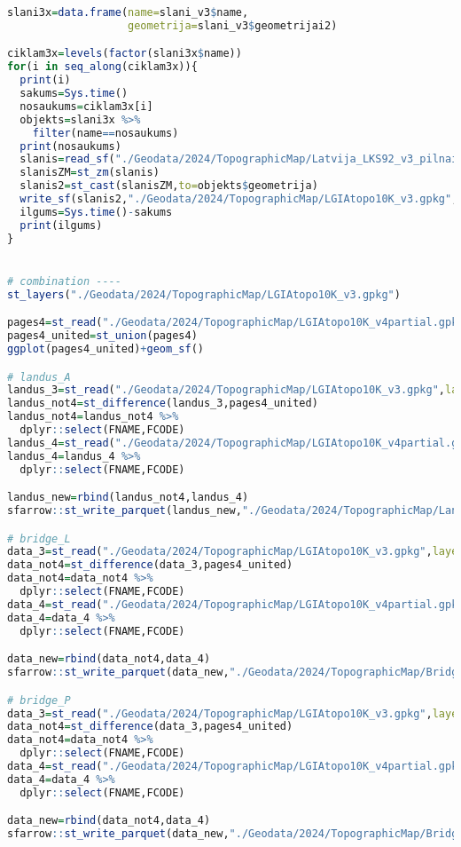 \documentclass[
]{book}
\begin{document}
\begin{lstlisting}[language=R]
slani3x=data.frame(name=slani_v3$name,
                   geometrija=slani_v3$geometrijai2)

ciklam3x=levels(factor(slani3x$name))
for(i in seq_along(ciklam3x)){
  print(i)
  sakums=Sys.time()
  nosaukums=ciklam3x[i]
  objekts=slani3x %>% 
    filter(name==nosaukums)
  print(nosaukums)
  slanis=read_sf("./Geodata/2024/TopographicMap/Latvija_LKS92_v3_pilnais.gdb/",layer=nosaukums)
  slanisZM=st_zm(slanis)
  slanis2=st_cast(slanisZM,to=objekts$geometrija)
  write_sf(slanis2,"./Geodata/2024/TopographicMap/LGIAtopo10K_v3.gpkg",layer=nosaukums,append=FALSE)
  ilgums=Sys.time()-sakums
  print(ilgums)
}


# combination ----
st_layers("./Geodata/2024/TopographicMap/LGIAtopo10K_v3.gpkg")

pages4=st_read("./Geodata/2024/TopographicMap/LGIAtopo10K_v4partial.gpkg",layer="Topo10_lapas")
pages4_united=st_union(pages4)
ggplot(pages4_united)+geom_sf()

# landus_A
landus_3=st_read("./Geodata/2024/TopographicMap/LGIAtopo10K_v3.gpkg",layer="landus_A")
landus_not4=st_difference(landus_3,pages4_united)
landus_not4=landus_not4 %>% 
  dplyr::select(FNAME,FCODE)
landus_4=st_read("./Geodata/2024/TopographicMap/LGIAtopo10K_v4partial.gpkg",layer="landus_A")
landus_4=landus_4 %>% 
  dplyr::select(FNAME,FCODE)

landus_new=rbind(landus_not4,landus_4)
sfarrow::st_write_parquet(landus_new,"./Geodata/2024/TopographicMap/LandusA_COMB.parquet")

# bridge_L
data_3=st_read("./Geodata/2024/TopographicMap/LGIAtopo10K_v3.gpkg",layer="bridge_L")
data_not4=st_difference(data_3,pages4_united)
data_not4=data_not4 %>% 
  dplyr::select(FNAME,FCODE)
data_4=st_read("./Geodata/2024/TopographicMap/LGIAtopo10K_v4partial.gpkg",layer="bridge_L")
data_4=data_4 %>% 
  dplyr::select(FNAME,FCODE)

data_new=rbind(data_not4,data_4)
sfarrow::st_write_parquet(data_new,"./Geodata/2024/TopographicMap/BridgeL_COMB.parquet")

# bridge_P
data_3=st_read("./Geodata/2024/TopographicMap/LGIAtopo10K_v3.gpkg",layer="bridge_P")
data_not4=st_difference(data_3,pages4_united)
data_not4=data_not4 %>% 
  dplyr::select(FNAME,FCODE)
data_4=st_read("./Geodata/2024/TopographicMap/LGIAtopo10K_v4partial.gpkg",layer="bridge_P")
data_4=data_4 %>% 
  dplyr::select(FNAME,FCODE)

data_new=rbind(data_not4,data_4)
sfarrow::st_write_parquet(data_new,"./Geodata/2024/TopographicMap/BridgeP_COMB.parquet")


\end{lstlisting}
\end{document}
